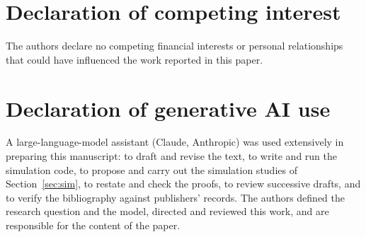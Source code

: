 \documentclass[10pt,twocolumn]{article}
\theoremstyle{definition}
\begin{document}
\section*{Declaration of competing interest}
The authors declare no competing financial interests or personal relationships that could have influenced the work reported in this paper.

\section*{Declaration of generative AI use}
A large-language-model assistant (Claude, Anthropic) was used extensively in preparing this manuscript: to draft and revise the text, to write and run the simulation code, to propose and carry out the simulation studies of Section~\ref{sec:sim}, to restate and check the proofs, to review successive drafts, and to verify the bibliography against publishers' records. The authors defined the research question and the model, directed and reviewed this work, and are responsible for the content of the paper.
\end{document}
